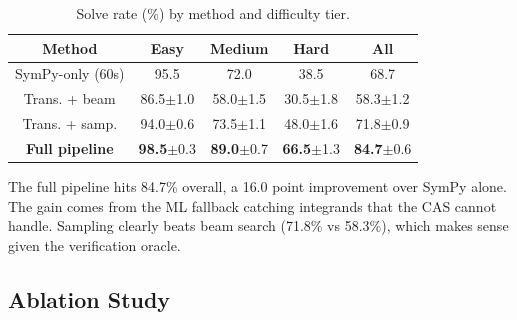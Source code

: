 \documentclass[conference]{IEEEtran}
\begin{document}
\begin{table}[htbp]
\caption{Solve rate (\%) by method and difficulty tier.}
\begin{center}
\begin{tabular}{|c|c|c|c|c|}
\hline
\textbf{Method} & \textbf{Easy} & \textbf{Medium} & \textbf{Hard} & \textbf{All} \\
\hline
SymPy-only (60s) & 95.5 & 72.0 & 38.5 & 68.7 \\
\hline
Trans. + beam & 86.5\footnotesize{$\pm$1.0} & 58.0\footnotesize{$\pm$1.5} & 30.5\footnotesize{$\pm$1.8} & 58.3\footnotesize{$\pm$1.2} \\
\hline
Trans. + samp. & 94.0\footnotesize{$\pm$0.6} & 73.5\footnotesize{$\pm$1.1} & 48.0\footnotesize{$\pm$1.6} & 71.8\footnotesize{$\pm$0.9} \\
\hline
\textbf{Full pipeline} & \textbf{98.5}\footnotesize{$\pm$0.3} & \textbf{89.0}\footnotesize{$\pm$0.7} & \textbf{66.5}\footnotesize{$\pm$1.3} & \textbf{84.7}\footnotesize{$\pm$0.6} \\
\hline
\end{tabular}
\label{tab:main}
\end{center}
\end{table}

The full pipeline hits 84.7\% overall, a 16.0 point improvement over SymPy alone. The gain comes from the ML fallback catching integrands that the CAS cannot handle. Sampling clearly beats beam search (71.8\% vs 58.3\%), which makes sense given the verification oracle.

\subsection{Ablation Study}
\end{document}
